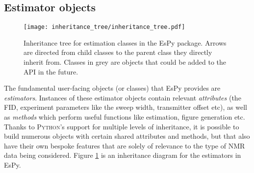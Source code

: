 \subsection{Estimator objects}
\begin{figure}
    \centering
    \texttt{[image: inheritance\_tree/inheritance\_tree.pdf]}
    \caption[
        Inheritance tree for estimation classes in the \acs{EsPy} package.
    ]{
        Inheritance tree for estimation classes in the \acs{EsPy} package.
        Arrows are directed from child classes to the parent class they
        directly inherit from. Classes in grey are objects that could be added
        to the \ac{API} in the future.
    }
    \label{fig:inheritance}
\end{figure}
The fundamental user-facing objects (or classes) that \ac{EsPy} provides are
\emph{estimators}.
Instances of these estimator objects contain relevant
\emph{attributes} (the \ac{FID}, experiment parameters like the sweep width,
transmitter offset etc), as well as \emph{methods} which perform useful
functions like estimation, figure generation etc.
Thanks to \textsc{Python}'s support for multiple levels of inheritance, it is
possible to build numerous objects with certain shared attributes and methods,
but that also have their own bespoke features that are solely of relevance to
the type of \ac{NMR} data being considered. Figure \ref{fig:inheritance} is an
inheritance diagram for the estimators in \ac{EsPy}.

